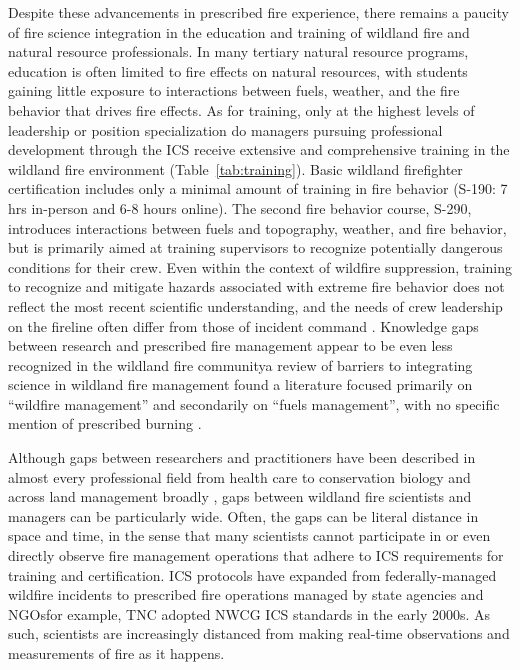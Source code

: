 \documentclass[fire,article,submit,moreauthors,pdftex]{Definitions/mdpi}
\begin{document}
Despite these advancements in prescribed fire experience, there remains a paucity of fire science integration in the education and training of wildland fire and natural resource professionals.
In many tertiary natural resource programs, education is often limited to fire effects on natural resources, with students gaining little exposure to interactions between fuels, weather, and the fire behavior that drives fire effects.
As for training, only at the highest levels of leadership or position specialization do managers pursuing professional development through the ICS receive extensive and comprehensive training in the wildland fire environment (Table~\ref{tab:training}).
Basic wildland firefighter certification includes only a minimal amount of training in fire behavior (S-190: 7 hrs in-person and 6-8 hours online).
The second fire behavior course, S-290, introduces interactions between fuels and topography, weather, and fire behavior, but is primarily aimed at training supervisors to recognize potentially dangerous conditions for their crew.
Even within the context of wildfire suppression, training to recognize and mitigate hazards associated with extreme fire behavior does not reflect the most recent scientific understanding, and the needs of crew leadership on the fireline often differ from those of incident command \citep{werth2016}.
Knowledge gaps between research and prescribed fire management appear to be even less recognized in the wildland fire community\textemdash a review of barriers to integrating  science in wildland fire management found a literature focused primarily on ``wildfire management'' and secondarily on ``fuels management'', with no specific mention of prescribed burning \citep{hunter2020}.

Although gaps between researchers and practitioners have been described in almost every professional field from health care to conservation biology \citep{stott2012, prendergast1999} and across land management broadly \citep{carter2020}, gaps between wildland fire scientists and managers can be particularly wide.
Often, the gaps can be literal distance in space and time, in the sense that many scientists cannot participate in or even directly observe fire management operations that adhere to ICS requirements for training and certification.
ICS protocols have expanded from federally-managed wildfire incidents to prescribed fire operations managed by state agencies and NGOs\textemdash{}for example, TNC adopted NWCG ICS standards in the early 2000s.  
As such, scientists are increasingly distanced from making real-time observations and measurements of fire as it happens.
\end{document}
